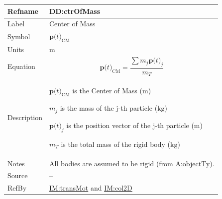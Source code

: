 \documentclass[12pt]{article}
\begin{document}
\medskip
\noindent
\begin{minipage}{\textwidth}
\begin{tabular}{>{\raggedright}p{}>{\raggedright\arraybackslash}p{}}
\toprule \textbf{Refname} & \textbf{DD:ctrOfMass}
\label{DD:ctrOfMass}
\\ \midrule
Label & Center of Mass
        
\\ \midrule
Symbol & ${\symbf{p}\text{(}t\text{)}_{\text{CM}}}$
         
\\ \midrule
Units & ${\text{m}}$
        
\\ \midrule
Equation & \begin{displaymath}
           {\symbf{p}\text{(}t\text{)}_{\text{CM}}}=\frac{\displaystyle\sum{{m_{j}} {\symbf{p}\text{(}t\text{)}_{j}}}}{{m_{T}}}
           \end{displaymath}
\\ \midrule
Description & \begin{symbDescription}
              \item{${\symbf{p}\text{(}t\text{)}_{\text{CM}}}$ is the Center of Mass (${\text{m}}$)}
              \item{${m_{j}}$ is the mass of the j-th particle (${\text{kg}}$)}
              \item{${\symbf{p}\text{(}t\text{)}_{j}}$ is the position vector of the j-th particle (${\text{m}}$)}
              \item{${m_{T}}$ is the total mass of the rigid body (${\text{kg}}$)}
              \end{symbDescription}
\\ \midrule
Notes & All bodies are assumed to be rigid (from \hyperref[assumpOT]{A:objectTy}).
        
\\ \midrule
Source & --
         
\\ \midrule
RefBy & \hyperref[IM:transMot]{IM:transMot} and \hyperref[IM:col2D]{IM:col2D}
        
\\ \bottomrule
\end{tabular}
\end{minipage}
\end{document}
